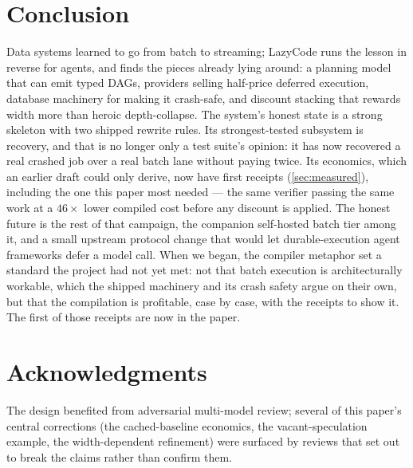 \documentclass[11pt]{article}
\begin{document}
\section{Conclusion}

Data systems learned to go from batch to streaming; LazyCode runs the lesson in reverse for agents, and finds the pieces already lying around: a planning model that can emit typed DAGs, providers selling half-price deferred execution, database machinery for making it crash-safe, and discount stacking that rewards width more than heroic depth-collapse. The system's honest state is a strong skeleton with two shipped rewrite rules. Its strongest-tested subsystem is recovery, and that is no longer only a test suite's opinion: it has now recovered a real crashed job over a real batch lane without paying twice. Its economics, which an earlier draft could only derive, now have first receipts (\cref{sec:measured}), including the one this paper most needed --- the same verifier passing the same work at a $46\times$ lower compiled cost before any discount is applied. The honest future is the rest of that campaign, the companion self-hosted batch tier among it, and a small upstream protocol change that would let durable-execution agent frameworks defer a model call. When we began, the compiler metaphor set a standard the project had not yet met: not that batch execution is architecturally workable, which the shipped machinery and its crash safety argue on their own, but that the compilation is profitable, case by case, with the receipts to show it. The first of those receipts are now in the paper.

\section*{Acknowledgments}
The design benefited from adversarial multi-model review; several of this paper's central corrections (the cached-baseline economics, the vacant-speculation example, the width-dependent refinement) were surfaced by reviews that set out to break the claims rather than confirm them.
\end{document}
